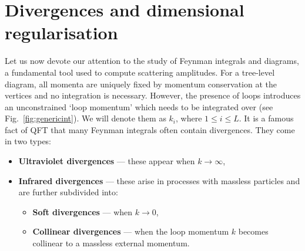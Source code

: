 \documentclass[main.tex]{subfiles}
\begin{document}
\section{Divergences and dimensional regularisation} \label{sec:divergences}
Let us now devote our attention to the study of Feynman integrals and diagrams, a fundamental tool used to compute scattering amplitudes. For a tree-level diagram, all momenta are uniquely fixed by momentum conservation at the vertices and no integration is necessary. However, the presence of loops introduces an unconstrained `loop momentum' which needs to be integrated over (see Fig.~\ref{fig:genericint}). We will denote them as $k_i$, where $1\le i\le L$. It is a famous fact of QFT that many Feynman integrals often contain divergences. They come in two types: 
\begin{itemize}
    \item \textbf{Ultraviolet divergences} --- these appear when $k \rightarrow \infty$,
\item \textbf{Infrared divergences} --- these arise in processes with massless particles and are further subdivided into:
\begin{itemize}
    \item \textbf{Soft divergences} --- when $k \rightarrow 0$,
    \item \textbf{Collinear divergences} --- when the loop momentum $k$ becomes collinear to a massless external momentum.
\end{itemize}
\end{itemize}
\end{document}
